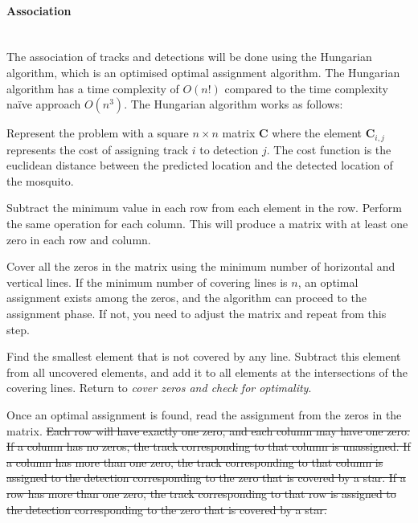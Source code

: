 \paragraph{Association}\mbox{}\\
The association of tracks and detections will be done using the Hungarian algorithm, which is an optimised optimal assignment algorithm. The Hungarian algorithm has a time complexity of $O\left(n!\right)$ compared to the time complexity na\"ive approach $O\left(n^3\right)$. The Hungarian algorithm works as follows:
\begin{description}[style=nextline]
    \item[Generate a cost matrix.] Represent the problem with a square $n \times n$ matrix $\mathbf{C}$ where the element $\mathbf{C}_{i,j}$ represents the cost of assigning track $i$ to detection $j$. The cost function is the euclidean distance between the predicted location and the detected location of the mosquito.
    \item[Row and column reduction.] Subtract the minimum value in each row from each element in the row. Perform the same operation for each column. This will produce a matrix with at least one zero in each row and column.
    \item[Cover zeros and check for optimality.] Cover all the zeros in the matrix using the minimum number of horizontal and vertical lines. If the minimum number of covering lines is $n$, an optimal assignment exists among the zeros, and the algorithm can proceed to the assignment phase. If not, you need to adjust the matrix and repeat from this step.
    \item[Adjust the matrix.] Find the smallest element that is not covered by any line. Subtract this element from all uncovered elements, and add it to all elements at the intersections of the covering lines. Return to \textit{cover zeros and check for optimality}.
    \item[Assignment.] Once an optimal assignment is found, read the assignment from the zeros in the matrix. \sout{Each row will have exactly one zero, and each column may have one zero. If a column has no zeros, the track corresponding to that column is unassigned. If a column has more than one zero, the track corresponding to that column is assigned to the detection corresponding to the zero that is covered by a star. If a row has more than one zero, the track corresponding to that row is assigned to the detection corresponding to the zero that is covered by a star.}
\end{description}



